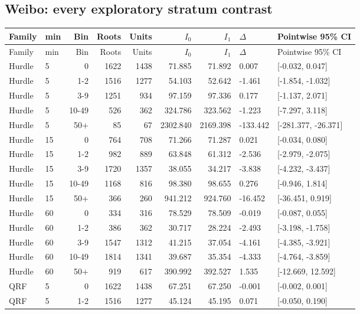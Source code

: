 \subsection{Weibo: every exploratory stratum contrast}
\footnotesize\setlength{\tabcolsep}{3pt}\begin{longtable}{llrrrrrll}
\toprule Family & min & Bin & Roots & Units & $I_0$ & $I_1$ & $\Delta$ & Pointwise 95\% CI\\\midrule\endfirsthead
\toprule Family & min & Bin & Roots & Units & $I_0$ & $I_1$ & $\Delta$ & Pointwise 95\% CI\\\midrule\endhead
Hurdle & 5 & 0 & 1622 & 1438 & 71.885 & 71.892 & 0.007 & [-0.032, 0.047]\\
Hurdle & 5 & 1-2 & 1516 & 1277 & 54.103 & 52.642 & -1.461 & [-1.854, -1.032]\\
Hurdle & 5 & 3-9 & 1251 & 934 & 97.159 & 97.336 & 0.177 & [-1.137, 2.071]\\
Hurdle & 5 & 10-49 & 526 & 362 & 324.786 & 323.562 & -1.223 & [-7.297, 3.118]\\
Hurdle & 5 & 50+ & 85 & 67 & 2302.840 & 2169.398 & -133.442 & [-281.377, -26.371]\\
Hurdle & 15 & 0 & 764 & 708 & 71.266 & 71.287 & 0.021 & [-0.034, 0.080]\\
Hurdle & 15 & 1-2 & 982 & 889 & 63.848 & 61.312 & -2.536 & [-2.979, -2.075]\\
Hurdle & 15 & 3-9 & 1720 & 1357 & 38.055 & 34.217 & -3.838 & [-4.232, -3.437]\\
Hurdle & 15 & 10-49 & 1168 & 816 & 98.380 & 98.655 & 0.276 & [-0.946, 1.814]\\
Hurdle & 15 & 50+ & 366 & 260 & 941.212 & 924.760 & -16.452 & [-36.451, 0.919]\\
Hurdle & 60 & 0 & 334 & 316 & 78.529 & 78.509 & -0.019 & [-0.087, 0.055]\\
Hurdle & 60 & 1-2 & 386 & 362 & 30.717 & 28.224 & -2.493 & [-3.198, -1.758]\\
Hurdle & 60 & 3-9 & 1547 & 1312 & 41.215 & 37.054 & -4.161 & [-4.385, -3.921]\\
Hurdle & 60 & 10-49 & 1814 & 1341 & 39.687 & 35.354 & -4.333 & [-4.764, -3.859]\\
Hurdle & 60 & 50+ & 919 & 617 & 390.992 & 392.527 & 1.535 & [-12.669, 12.592]\\
QRF & 5 & 0 & 1622 & 1438 & 67.251 & 67.250 & -0.001 & [-0.002, 0.001]\\
QRF & 5 & 1-2 & 1516 & 1277 & 45.124 & 45.195 & 0.071 & [-0.050, 0.190]\\

\end{longtable}

